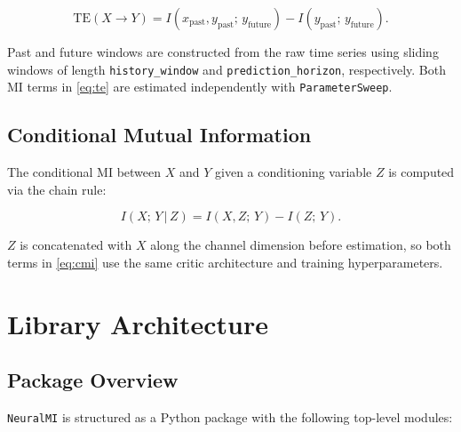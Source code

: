 \documentclass[12pt]{article}
\newcommand{\nmi}{\texttt{NeuralMI}}
\newcommand{\api}[1]{\texttt{#1}}
\begin{document}
\begin{equation}
  \mathrm{TE}(X\to Y)
  = I(x_{\mathrm{past}}, y_{\mathrm{past}};\, y_{\mathrm{future}})
    - I(y_{\mathrm{past}};\, y_{\mathrm{future}}).
  \label{eq:te}
\end{equation}

Past and future windows are constructed from the raw time series using
sliding windows of length \api{history\_window} and
\api{prediction\_horizon}, respectively.  Both MI terms in \cref{eq:te}
are estimated independently with \api{ParameterSweep}.

\subsection{Conditional Mutual Information}
\label{sec:theory:cmi}

The conditional MI between $X$ and $Y$ given a conditioning variable $Z$
is computed via the chain rule:

\begin{equation}
  I(X;\,Y\,|\,Z)
  = I(X,Z;\,Y) - I(Z;\,Y).
  \label{eq:cmi}
\end{equation}

$Z$ is concatenated with $X$ along the channel dimension before estimation,
so both terms in \cref{eq:cmi} use the same critic architecture and training
hyperparameters.

\section{Library Architecture}
\label{sec:architecture}

\subsection{Package Overview}

\nmi{} is structured as a Python package with the following top-level
modules:
\end{document}

